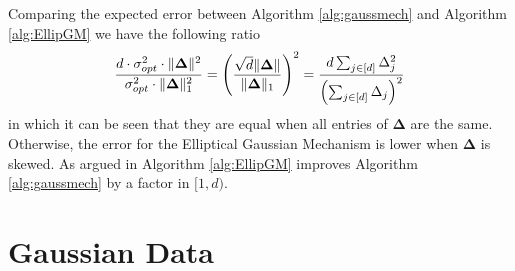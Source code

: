 \documentclass[a4paper,12pt]{article}
\begin{document}
Comparing the expected error between Algorithm \ref{alg:gaussmech} and Algorithm \ref{alg:EllipGM} we have the following ratio
\[
    \frac{d \cdot \sigma_{opt}^2 \cdot \| \bm{\Delta} \|^2 }{\sigma_{opt}^2 \cdot \| \bm{\Delta} \|_1^2} 
    = \left (\frac{\sqrt{d}\| \bm{\Delta} \|}{\| \bm{\Delta} \|_1}\right)^2
    = \frac{d \sum_{j \in [d]} \Delta_j^2}{\left (\sum_{j \in [d]} \Delta_j\right)^2}
\]
in which it can be seen that they are equal when all entries of $\bm{\Delta}$ are the same. Otherwise, the error for the Elliptical Gaussian Mechanism is lower
when $\bm{\Delta}$ is skewed. As argued in \cite{Lebeda2022} Algorithm \ref{alg:EllipGM} improves Algorithm \ref{alg:gaussmech} by a factor in $[1,d)$.

\section{Gaussian Data}
\end{document}
